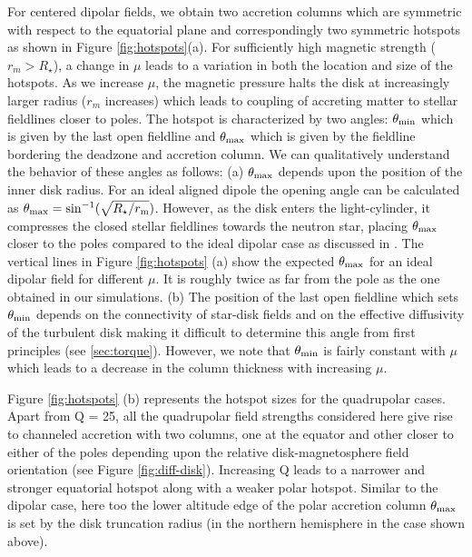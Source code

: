 \documentclass[fleqn,usenatbib]{mnras}
\newcommand{\rstar}{\ensuremath{R_{\star}}}
\begin{document}
For centered dipolar fields, we obtain two accretion columns which are symmetric with respect to the equatorial plane and correspondingly two symmetric hotspots as shown in Figure \ref{fig:hotspots}(a). For sufficiently high magnetic strength ($r_m > \rstar$), a change in $\mu$ leads to a variation in both the location and size of the hotspots. As we increase $\mu$, the magnetic pressure halts the disk at increasingly larger radius ($r_m$ increases) which leads to coupling of accreting matter to stellar fieldlines closer to poles. 
The hotspot is characterized by two angles: $\theta_{\rm min}$ which is given by the last open fieldline and $\theta_{\rm max}$ which is given by the fieldline bordering the deadzone and accretion column. We can qualitatively understand the behavior of these angles as follows: (a) $\theta_{\rm max}$ depends upon the position of the inner disk radius. For an ideal aligned dipole the opening angle can be calculated as $\theta_{\rm max} = {\rm sin}^{-1} (\sqrt{\rstar/r_{\rm m}})$. However, as the disk enters the light-cylinder, it compresses the closed stellar fieldlines towards the neutron star, placing $\theta_{\rm max}$ closer to the poles compared to the ideal dipolar case as discussed in \cite{Zanni2009}. The vertical lines in Figure \ref{fig:hotspots} (a) show the expected $\theta_{\rm max}$ for an ideal dipolar field for different $\mu$. It is roughly twice as far from the pole as the one obtained in our simulations. (b) The position of the last open fieldline which sets $\theta_{\rm min}$ depends on the  connectivity of star-disk fields and on the effective diffusivity of the turbulent disk making it difficult to determine this angle from first principles (see \ref{sec:torque}). However, we note that $\theta_{\rm min}$ is fairly constant with $\mu$ which leads to a decrease in the column thickness with increasing $\mu$.  

Figure \ref{fig:hotspots} (b) represents the hotspot sizes for the quadrupolar cases. Apart from Q = 25, all the quadrupolar field strengths considered here give rise to channeled accretion with two columns, one at the equator and other closer to either of the poles depending upon the relative disk-magnetosphere field orientation (see Figure \ref{fig:diff-disk}). Increasing Q leads to a narrower and stronger equatorial hotspot along with a weaker polar hotspot. Similar to the dipolar case, here too the lower altitude edge of the polar accretion column $\theta_{\rm max}$ is set by the disk truncation radius (in the northern hemisphere in the case shown above).  
\end{document}

